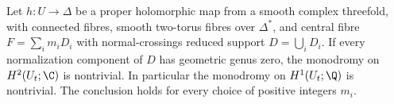 \begin{proposition}\hypertarget{tag-01GA}{}\label{cdp:st:D.2.3}


Let $h:U\to\Delta$ be a proper holomorphic map from a smooth
complex threefold, with connected fibres, smooth two-torus fibres
over $\Delta^*$, and central fibre $F=\sum_i m_iD_i$ with
normal-crossings reduced support $D=\bigcup_iD_i$.
If every normalization component of $D$ has geometric genus zero,
the monodromy on $H^2(U_t;\C)$ is nontrivial. In particular the
monodromy on $H^1(U_t;\Q)$ is nontrivial. The conclusion holds for every choice of positive integers $m_i$.
\end{proposition}


